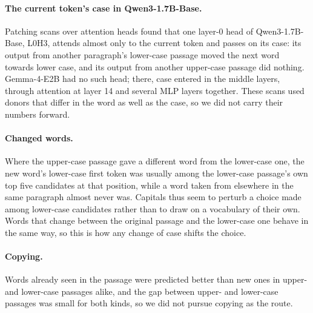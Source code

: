 \documentclass[11pt]{article}
\newcommand{\gm}{Gemma-4-E2B}
\newcommand{\qw}{Qwen3-1.7B-Base}
\newcommand{\hd}[2]{L#1H#2}
\begin{document}
\paragraph{The current token's case in \qw{}.} Patching scans over attention heads found that one layer-0 head of \qw{}, \hd{0}{3}, attends almost only to the current token and passes on its case: its output from another paragraph's lower-case passage moved the next word towards lower case, and its output from another upper-case passage did nothing. \gm{} had no such head; there, case entered in the middle layers, through attention at layer 14 and several MLP layers together. These scans used donors that differ in the word as well as the case, so we did not carry their numbers forward.

\paragraph{Changed words.} Where the upper-case passage gave a different word from the lower-case one, the new word's lower-case first token was usually among the lower-case passage's own top five candidates at that position, while a word taken from elsewhere in the same paragraph almost never was. Capitals thus seem to perturb a choice made among lower-case candidates rather than to draw on a vocabulary of their own. Words that change between the original passage and the lower-case one behave in the same way, so this is how any change of case shifts the choice.

\paragraph{Copying.} Words already seen in the passage were predicted better than new ones in upper- and lower-case passages alike, and the gap between upper- and lower-case passages was small for both kinds, so we did not pursue copying as the route.
\end{document}

